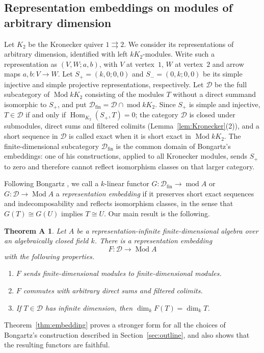 \documentclass[a4paper,reqno,10pt]{amsart}
\newtheorem*{theoremA}{Theorem A}
\theoremstyle{definition}
\DeclareMathOperator{\Hom}{Hom}
\DeclareMathOperator{\Mod}{Mod}
\DeclareMathOperator{\md}{mod}
\newcommand{\dm}{\dim_k}
\newcommand{\D}{\mathcal D}
\numberwithin{equation}{section}
\begin{document}
\subsection{Representation embeddings on modules of arbitrary dimension}
Let $K_2$ be the Kronecker quiver $1\rightrightarrows2$.
We consider its representations of arbitrary dimension, identified with
left $kK_2$-modules. Write such a representation as $(V,W;a,b)$, with $V$
at vertex~$1$, $W$ at vertex~$2$ and arrow maps $a,b:V\to W$. Let $S_+=(k,0;0,0)$ and $S_-=(0,k;0,0)$ be its simple
injective and simple projective representations, respectively.
Let $\D$ be the full subcategory of $\Mod kK_2$ consisting of the modules
$T$ without a direct summand isomorphic to $S_+$, and put $\D_{\mathrm{fin}}=\D\cap\md kK_2$.
Since $S_+$ is simple
and injective, $T\in\D$ if and only if $\Hom_{K_2}(S_+,T)=0$; the category $\D$
is closed under submodules, direct sums and filtered colimits
(Lemma~\ref{lem:Kronecker}(2)), and a short sequence in $\D$ is
called exact when it is short exact in $\Mod kK_2$.
The finite-dimensional subcategory $\D_{\mathrm{fin}}$ is the common domain of Bongartz's embeddings:
one of his constructions, applied to all Kronecker modules, sends $S_+$ to zero and therefore cannot reflect
isomorphism classes on that larger category.

Following Bongartz \cite[\S2.1]{Bongartz}, we call a
$k$-linear functor $G:\D_{\mathrm{fin}}\to\md A$ or $G:\D\to\Mod A$ a \emph{representation embedding} if it preserves short exact sequences and
indecomposability and reflects isomorphism classes, in the sense that $G(T)\cong G(U)$
implies $T\cong U$.
Our main result is the following.
\begin{theoremA}
Let $A$ be a representation-infinite finite-dimensional algebra over an
algebraically closed field $k$. There is a representation embedding
\[
 F:\D\longrightarrow\Mod A
\]
with the following properties.
\begin{enumerate}
\item $F$ sends finite-dimensional modules to finite-dimensional modules.
\item $F$ commutes with arbitrary direct sums and filtered colimits.
\item If $T\in\D$ has infinite dimension, then $\dm F(T)=\dm T$.
\end{enumerate}
\end{theoremA}
Theorem~\ref{thm:embedding} proves a stronger form for all the choices of
Bongartz's construction described in Section~\ref{sec:outline}, and also
shows that the resulting functors are faithful.
\end{document}
